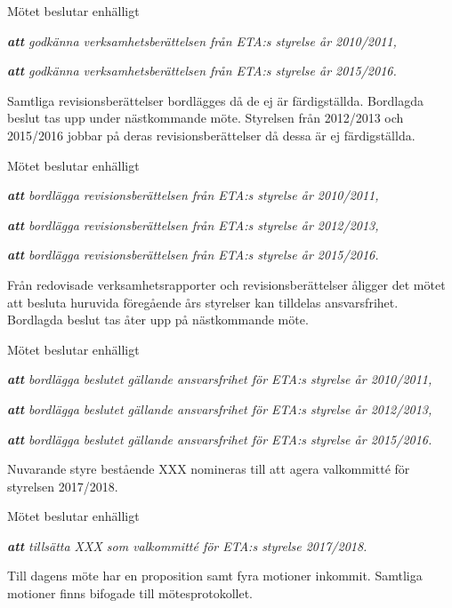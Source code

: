 Mötet beslutar enhälligt

\emph{\textbf{att} godkänna verksamhetsberättelsen från ETA:s styrelse år 2010/2011,}

\emph{\textbf{att} godkänna verksamhetsberättelsen från ETA:s styrelse år 2015/2016.}


\sect[Revisionsberättelser]
Samtliga revisionsberättelser bordlägges då de ej är färdigställda. Bordlagda beslut tas upp under nästkommande möte. Styrelsen från 2012/2013 och 2015/2016 jobbar på deras revisionsberättelser då dessa är ej färdigställda.


Mötet beslutar enhälligt

\emph{\textbf{att} bordlägga revisionsberättelsen från ETA:s styrelse år 2010/2011,}

\emph{\textbf{att} bordlägga revisionsberättelsen från ETA:s styrelse år 2012/2013,}

\emph{\textbf{att} bordlägga revisionsberättelsen från ETA:s styrelse år 2015/2016.}



\sect[Ansvarsfriheter]
Från redovisade verksamhetsrapporter och revisionsberättelser åligger det mötet att besluta huruvida föregående års styrelser kan tilldelas ansvarsfrihet. Bordlagda beslut tas åter upp på nästkommande möte.

Mötet beslutar enhälligt

\emph{\textbf{att} bordlägga beslutet gällande ansvarsfrihet för ETA:s styrelse år 2010/2011,}

\emph{\textbf{att} bordlägga beslutet gällande ansvarsfrihet för ETA:s styrelse år 2012/2013,}

\emph{\textbf{att} bordlägga beslutet gällande ansvarsfrihet för ETA:s styrelse år 2015/2016.}






Nuvarande styre bestående XXX nomineras till att agera valkommitté för styrelsen 2017/2018.

 Mötet beslutar enhälligt
 
 \emph{\textbf{att} tillsätta XXX som valkommitté för ETA:s styrelse 2017/2018.}





Till dagens möte har en proposition samt fyra motioner inkommit. Samtliga \linebreak motioner finns bifogade till mötesprotokollet.

